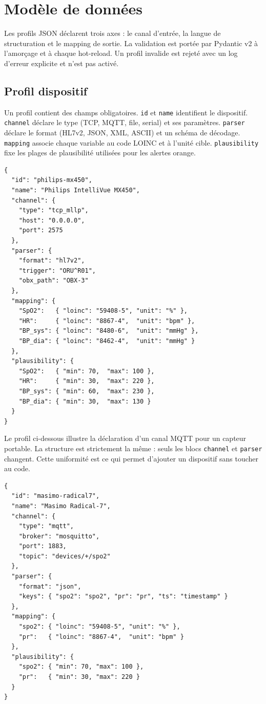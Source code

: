 \section{Modèle de données}
\label{sec:archi-modele-donnees}

Les profils JSON déclarent trois axes : le canal d'entrée, la langue de structuration et le mapping de sortie. La validation est portée par Pydantic v2 à l'amorçage et à chaque hot-reload. Un profil invalide est rejeté avec un log d'erreur explicite et n'est pas activé.

\subsection{Profil dispositif}

Un profil contient des champs obligatoires. \texttt{id} et \texttt{name} identifient le dispositif. \texttt{channel} déclare le type (TCP, MQTT, file, serial) et ses paramètres. \texttt{parser} déclare le format (HL7v2, JSON, XML, ASCII) et un schéma de décodage. \texttt{mapping} associe chaque variable au code LOINC et à l'unité cible. \texttt{plausibility} fixe les plages de plausibilité utilisées pour les alertes orange.

\begin{lstlisting}[style=bridgejson, caption={Profil JSON pour le moniteur Philips IntelliVue MX450.}, label={lst:profile-philips}]
{
  "id": "philips-mx450",
  "name": "Philips IntelliVue MX450",
  "channel": {
    "type": "tcp_mllp",
    "host": "0.0.0.0",
    "port": 2575
  },
  "parser": {
    "format": "hl7v2",
    "trigger": "ORU^R01",
    "obx_path": "OBX-3"
  },
  "mapping": {
    "SpO2":   { "loinc": "59408-5", "unit": "%" },
    "HR":     { "loinc": "8867-4",  "unit": "bpm" },
    "BP_sys": { "loinc": "8480-6",  "unit": "mmHg" },
    "BP_dia": { "loinc": "8462-4",  "unit": "mmHg" }
  },
  "plausibility": {
    "SpO2":   { "min": 70,  "max": 100 },
    "HR":     { "min": 30,  "max": 220 },
    "BP_sys": { "min": 60,  "max": 230 },
    "BP_dia": { "min": 30,  "max": 130 }
  }
}
\end{lstlisting}

Le profil ci-dessous illustre la déclaration d'un canal MQTT pour un capteur portable. La structure est strictement la même : seuls les blocs \texttt{channel} et \texttt{parser} changent. Cette uniformité est ce qui permet d'ajouter un dispositif sans toucher au code.

\begin{lstlisting}[style=bridgejson, caption={Profil JSON pour le glucomètre Masimo Radical-7 via MQTT.}, label={lst:profile-masimo}]
{
  "id": "masimo-radical7",
  "name": "Masimo Radical-7",
  "channel": {
    "type": "mqtt",
    "broker": "mosquitto",
    "port": 1883,
    "topic": "devices/+/spo2"
  },
  "parser": {
    "format": "json",
    "keys": { "spo2": "spo2", "pr": "pr", "ts": "timestamp" }
  },
  "mapping": {
    "spo2": { "loinc": "59408-5", "unit": "%" },
    "pr":   { "loinc": "8867-4",  "unit": "bpm" }
  },
  "plausibility": {
    "spo2": { "min": 70, "max": 100 },
    "pr":   { "min": 30, "max": 220 }
  }
}
\end{lstlisting}

